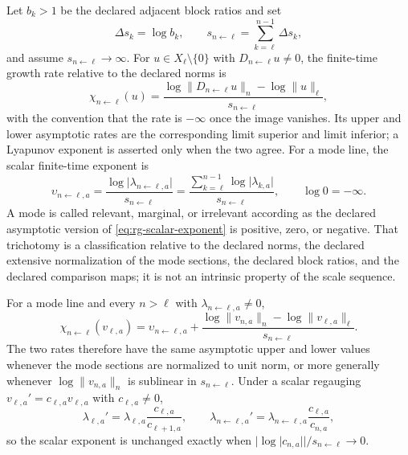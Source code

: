 Let \(b_k>1\) be the declared adjacent block ratios and set
\begin{equation}
\Delta s_k=\log b_k,
\qquad
s_{n\leftarrow\ell}=\sum_{k=\ell}^{n-1}\Delta s_k,
\label{eq:rg-cumulative-log-scale}
\end{equation}
and assume \(s_{n\leftarrow\ell}\to\infty\). For \(u\in X_\ell\setminus\{0\}\)
with \(D_{n\leftarrow\ell}u\neq0\), the finite-time growth rate relative to the
declared norms is
\begin{equation}
\chi_{n\leftarrow\ell}(u)
 =\frac{\log\lVert D_{n\leftarrow\ell}u\rVert_n
-\log\lVert u\rVert_\ell}{s_{n\leftarrow\ell}},
\label{eq:rg-finite-time-rate}
\end{equation}
with the convention that the rate is \(-\infty\) once the image vanishes. Its
upper and lower asymptotic rates are the corresponding limit superior and limit
inferior; a Lyapunov exponent is asserted only when the two agree. For a mode
line, the scalar finite-time exponent is
\begin{equation}
\upsilon_{n\leftarrow\ell,a}
=\frac{\log\lvert\lambda_{n\leftarrow\ell,a}\rvert}{s_{n\leftarrow\ell}}
=\frac{\sum_{k=\ell}^{n-1}\log\lvert\lambda_{k,a}\rvert}{s_{n\leftarrow\ell}},
\qquad \log 0=-\infty.
\label{eq:rg-scalar-exponent}
\end{equation}
A mode is called relevant, marginal, or irrelevant according as the declared
asymptotic version of \eqref{eq:rg-scalar-exponent} is positive, zero, or
negative. That trichotomy is a classification relative to the declared norms,
the declared extensive normalization of the mode sections, the declared block
ratios, and the declared comparison maps; it is not an intrinsic property of the
scale sequence. 

For a mode line and every \(n>\ell\) with \(\lambda_{n\leftarrow\ell,a}\neq0\),
\begin{equation}
\chi_{n\leftarrow\ell}(v_{\ell,a})
=\upsilon_{n\leftarrow\ell,a}
+\frac{\log\lVert v_{n,a}\rVert_n-\log\lVert v_{\ell,a}\rVert_\ell}
{s_{n\leftarrow\ell}}.
\label{eq:rg-mode-exponent-relation}
\end{equation}
The two rates therefore have the same asymptotic upper and lower values whenever
the mode sections are normalized to unit norm, or more generally whenever
\(\log\lVert v_{n,a}\rVert_n\) is sublinear in \(s_{n\leftarrow\ell}\). Under a
scalar regauging \(v_{\ell,a}'=c_{\ell,a}v_{\ell,a}\) with
\(c_{\ell,a}\neq0\),
\begin{equation}
\lambda_{\ell,a}'=\lambda_{\ell,a}\frac{c_{\ell,a}}{c_{\ell+1,a}},
\qquad
\lambda_{n\leftarrow\ell,a}'
=\lambda_{n\leftarrow\ell,a}\frac{c_{\ell,a}}{c_{n,a}},
\label{eq:rg-mode-scalar-gauge}
\end{equation}
so the scalar exponent is unchanged exactly when
\(\lvert\log\lvert c_{n,a}\rvert\rvert/s_{n\leftarrow\ell}\to0\).


